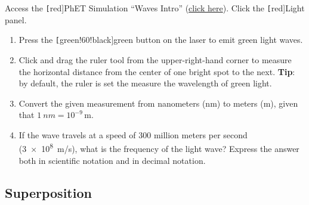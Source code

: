 \documentclass[main.tex]{subfiles}
\begin{document}
\begin{exercise} \label{3zl6SU}
    Access the \texttt[red]{PhET Simulation} ``Waves Intro'' (\href{https://phet.colorado.edu/sims/html/waves-intro/latest/waves-intro_en.html}{click here}). Click the \texttt[red]{Light} panel. 

    \begin{enumerate}
    \setlength\itemsep{0.1ex}
        \item Press the \texttt[green!60!black]{green} button on the laser to emit green light waves.
        \item Click and drag the ruler tool from the upper-right-hand corner to measure the horizontal distance from the center of one bright spot to the next. \textbf{Tip}: by default, the ruler is set the measure the wavelength of green light.
        \item Convert the given measurement from nanometers (nm) to meters (m), given that $\SI{1}{nm} = 10^{-9}\,\text{m}$.
        \item If the wave travels at a speed of 300 million meters per second (\SI{3e8}{m/s}), what is the frequency of the light wave? Express the answer both in scientific notation and in decimal notation.
    \end{enumerate}


\end{exercise}

\cyanhrule


\subsection{Superposition} \label{96T5dZ}
\end{document}
